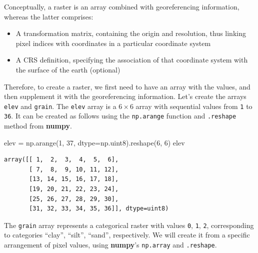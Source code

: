 \documentclass[
  letterpaper,
]{krantz}
\newenvironment{Shaded}{\begin{snugshade}}{\end{snugshade}}
\newcommand{\DecValTok}[1]{\textcolor[rgb]{0.68,0.00,0.00}{#1}}
\newcommand{\NormalTok}[1]{\textcolor[rgb]{0.00,0.23,0.31}{#1}}
\newcommand{\OperatorTok}[1]{\textcolor[rgb]{0.37,0.37,0.37}{#1}}
\providecommand{\tightlist}{%
  \setlength{\itemsep}{0pt}\setlength{\parskip}{0pt}}\usepackage{longtable,booktabs,array}
\begin{document}
Conceptually, a raster is an array combined with georeferencing
information, whereas the latter comprises:

\begin{itemize}
\tightlist
\item
  A transformation matrix, containing the origin and resolution, thus
  linking pixel indices with coordinates in a particular coordinate
  system
\item
  A CRS definition, specifying the association of that coordinate system
  with the surface of the earth (optional)
\end{itemize}

Therefore, to create a raster, we first need to have an array with the
values, and then supplement it with the georeferencing information.
Let's create the arrays \texttt{elev} and \texttt{grain}. The
\texttt{elev} array is a \(6 \times 6\) array with sequential values
from \texttt{1} to \texttt{36}. It can be created as follows using the
\texttt{np.arange} function and \texttt{.reshape} method from
\textbf{numpy}.

\begin{Shaded}
\begin{Highlighting}[]
\NormalTok{elev }\OperatorTok{=}\NormalTok{ np.arange(}\DecValTok{1}\NormalTok{, }\DecValTok{37}\NormalTok{, dtype}\OperatorTok{=}\NormalTok{np.uint8).reshape(}\DecValTok{6}\NormalTok{, }\DecValTok{6}\NormalTok{)}
\NormalTok{elev}
\end{Highlighting}
\end{Shaded}

\begin{verbatim}
array([[ 1,  2,  3,  4,  5,  6],
       [ 7,  8,  9, 10, 11, 12],
       [13, 14, 15, 16, 17, 18],
       [19, 20, 21, 22, 23, 24],
       [25, 26, 27, 28, 29, 30],
       [31, 32, 33, 34, 35, 36]], dtype=uint8)
\end{verbatim}

The \texttt{grain} array represents a categorical raster with values
\texttt{0}, \texttt{1}, \texttt{2}, corresponding to categories
``clay'', ``silt'', ``sand'', respectively. We will create it from a
specific arrangement of pixel values, using \textbf{numpy}'s
\texttt{np.array} and \texttt{.reshape}.
\end{document}
